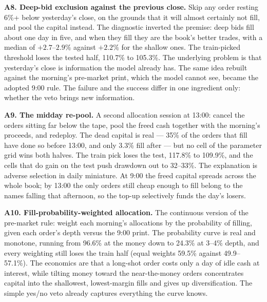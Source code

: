 \documentclass[11pt,a4paper]{article}
\begin{document}
\textbf{A8. Deep-bid exclusion against the previous close.} Skip any order
resting 6\%+ below yesterday's close, on the grounds that it will almost
certainly not fill, and pool the capital instead. The diagnostic inverted
the premise: deep bids fill about one day in five, and when they fill they
are the book's better trades, with a median of $+2.7$--$2.9\%$ against
$+2.2\%$ for the shallow ones. The train-picked threshold loses the tested
half, 110.7\% to 105.3\%. The underlying problem is that yesterday's close
is information the model already has. The same idea rebuilt against the
morning's pre-market print, which the model cannot see, became the adopted
9:00 rule. The failure and the success differ in one ingredient only:
whether the veto brings new information.

\textbf{A9. The midday re-pool.} A second allocation session at 13:00:
cancel the orders sitting far below the tape, pool the freed cash together
with the morning's proceeds, and redeploy. The dead capital is real --- 35\%
of the orders that fill have done so before 13:00, and only 3.3\% fill after
--- but no cell of the parameter grid wins both halves. The train pick loses
the test, 117.8\% to 109.9\%, and the cells that do gain on the test push
drawdown out to 32--33\%. The explanation is adverse selection in daily
miniature. At 9:00 the freed capital spreads across the whole book; by 13:00
the only orders still cheap enough to fill belong to the names falling that
afternoon, so the top-up selectively funds the day's losers.

\textbf{A10. Fill-probability-weighted allocation.} The continuous version
of the pre-market rule: weight each morning's allocations by the probability
of filling, given each order's depth versus the 9:00 print. The probability
curve is real and monotone, running from 96.6\% at the money down to 24.3\%
at 3--4\% depth, and every weighting still loses the train half (equal
weights 59.5\% against 49.9--57.1\%). The economics are that a long-shot
order costs only a day of idle cash at interest, while tilting money toward
the near-the-money orders concentrates capital into the shallowest,
lowest-margin fills and gives up diversification. The simple yes/no veto
already captures everything the curve knows.
\end{document}
